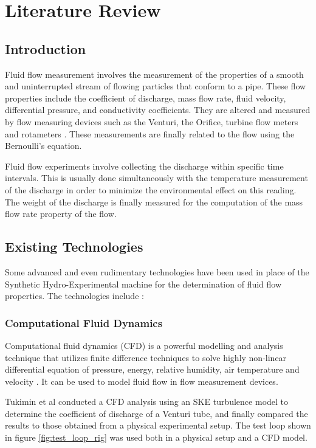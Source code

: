 \section{Literature Review}
\label{sec:review}
\subsection{Introduction}
Fluid flow measurement involves the measurement of the properties of a smooth and uninterrupted stream of flowing particles that conform to a pipe. These flow properties include the coefficient of discharge, mass flow rate, fluid velocity, differential pressure, and conductivity coefficients. They are altered and measured by flow measuring devices such as the Venturi, the Orifice, turbine flow meters and rotameters \cite{nandagopal2022fluid}. These measurements are finally related to the flow using the Bernoulli's equation. 
\par
Fluid flow experiments involve collecting the discharge within specific time intervals. This is usually done simultaneously with the temperature measurement of the discharge in order to minimize the environmental effect on this reading. The weight of the discharge is finally measured for the computation of the mass flow rate property of the flow.

\subsection{Existing Technologies}
Some advanced and even rudimentary technologies have been used in place of the Synthetic Hydro-Experimental machine for the determination of fluid flow properties. The technologies include :   
\subsubsection{Computational Fluid Dynamics}
Computational fluid dynamics (CFD) is a powerful modelling and analysis technique that utilizes finite difference techniques to solve highly non-linear differential equation of pressure, energy, relative humidity, air temperature and velocity \cite{kuntz2009pre}. It can be used to model fluid flow in flow measurement devices.
\par
Tukimin et al \cite{tukimin2016cfd} conducted a CFD analysis using an \ac{SKE} turbulence model to determine the coefficient of discharge of a Venturi tube, and finally compared the results to those obtained from a physical experimental setup. The test loop shown in figure \ref{fig:test_loop_rig} was used both in a physical setup and a CFD model. 

